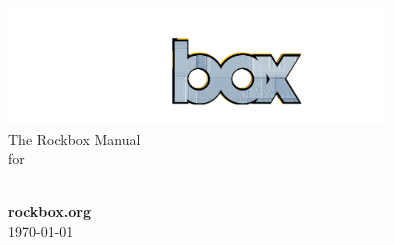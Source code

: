 \thispagestyle{empty}
\vspace*{0.3cm}
\begin{center}
\includegraphics[width=10cm]{frontpage/rockbox3540.png}\\
\vspace{2cm}
\huge{The Rockbox Manual\\for\\\playername}\vspace{1cm}\\

\vspace{\fill}

\large \textbf{rockbox.org}\ \\\today


\end{center}

\pagebreak
\thispagestyle{empty}
\cleardoublepage
